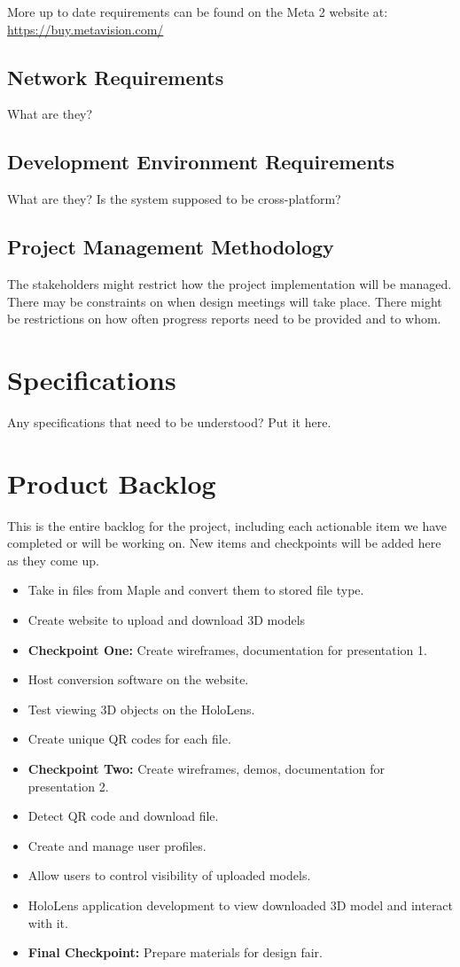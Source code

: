 More up to date requirements can be found on the Meta 2 website at: \url{https://buy.metavision.com/}

\subsection{Network Requirements}
What are they?


\subsection{Development Environment Requirements}
What are they?  Is the system supposed to be cross-platform?

\subsection{Project  Management Methodology}
The stakeholders might restrict how the project implementation will be managed.
 There may be constraints on when design meetings will take place.  There might
be restrictions on how often progress reports need to be provided and to whom.


\section{Specifications}
Any specifications that need to be understood?  Put it here.

\section{Product Backlog}
This is the entire backlog for the project, including each actionable item we 
have completed or will be working on. New items and checkpoints will be added 
here as they come up.
\begin{itemize}
\item Take in files from Maple and convert them to stored file type.
\item Create website to upload and download 3D models
\item \textbf{Checkpoint One:} Create wireframes, documentation for presentation 1.
\item Host conversion software on the website.
\item Test viewing 3D objects on the HoloLens.
\item Create unique QR codes for each file. 
\item \textbf{Checkpoint Two:} Create wireframes, demos, documentation for presentation 
2.
\item Detect QR code and download file.
\item Create and manage user profiles.
\item Allow users to control visibility of uploaded models.
\item HoloLens application development to view downloaded 3D model and interact 
with it.
\item \textbf{Final Checkpoint:} Prepare materials for design fair.
\end{itemize}

